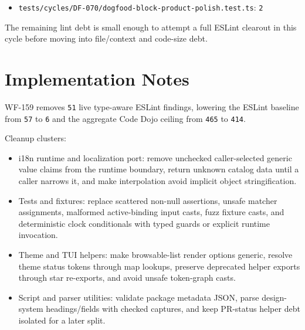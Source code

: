 \begin{itemize}
\item
  \texttt{t\allowbreak{}e\allowbreak{}s\allowbreak{}t\allowbreak{}s\allowbreak{}/\allowbreak{}c\allowbreak{}y\allowbreak{}c\allowbreak{}l\allowbreak{}e\allowbreak{}s\allowbreak{}/\allowbreak{}D\allowbreak{}F\allowbreak{}-\allowbreak{}0\allowbreak{}7\allowbreak{}0\allowbreak{}/\allowbreak{}d\allowbreak{}o\allowbreak{}g\allowbreak{}f\allowbreak{}o\allowbreak{}o\allowbreak{}d\allowbreak{}-\allowbreak{}b\allowbreak{}l\allowbreak{}o\allowbreak{}c\allowbreak{}k\allowbreak{}-\allowbreak{}p\allowbreak{}r\allowbreak{}o\allowbreak{}d\allowbreak{}u\allowbreak{}c\allowbreak{}t\allowbreak{}-\allowbreak{}p\allowbreak{}o\allowbreak{}l\allowbreak{}i\allowbreak{}s\allowbreak{}h\allowbreak{}.\allowbreak{}t\allowbreak{}e\allowbreak{}s\allowbreak{}t\allowbreak{}.\allowbreak{}t\allowbreak{}s}: \texttt{2}
\end{itemize}

The remaining lint debt is small enough to attempt a full ESLint clearout in this cycle before moving into file/context and code-size debt.

\section{Implementation Notes}\label{record-241-implementation-notes}

WF-159 removes \texttt{5\allowbreak{}1} live type-aware ESLint findings, lowering the ESLint baseline from \texttt{5\allowbreak{}7} to \texttt{6} and the aggregate Code Dojo ceiling from \texttt{4\allowbreak{}6\allowbreak{}5} to \texttt{4\allowbreak{}1\allowbreak{}4}.

Cleanup clusters:

\begin{itemize}
\tightlist
\item
  i18n runtime and localization port: remove unchecked caller-selected generic value claims from the runtime boundary, return unknown catalog data until a caller narrows it, and make interpolation avoid implicit object stringification.
\item
  Tests and fixtures: replace scattered non-null assertions, unsafe matcher assignments, malformed active-binding input casts, fuzz fixture casts, and deterministic clock conditionals with typed guards or explicit runtime invocation.
\item
  Theme and TUI helpers: make browsable-list render options generic, resolve theme status tokens through map lookups, preserve deprecated helper exports through star re-exports, and avoid unsafe token-graph casts.
\item
  Script and parser utilities: validate package metadata JSON, parse design-system headings/fields with checked captures, and keep PR-status helper debt isolated for a later split.
\end{itemize}

